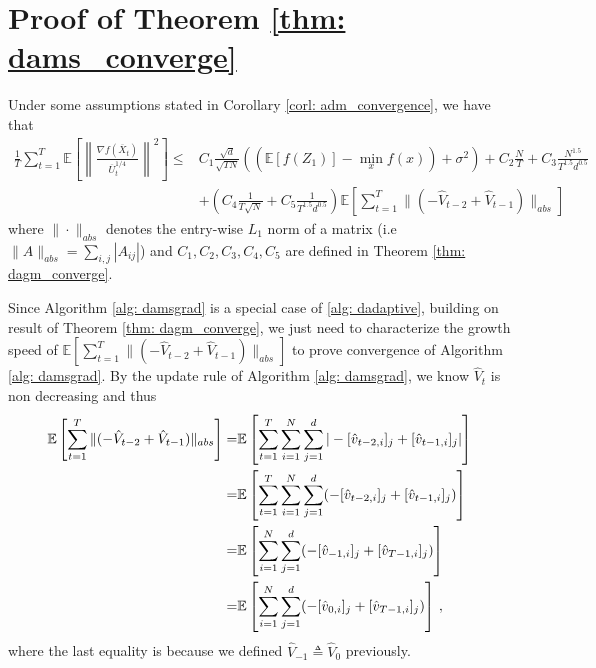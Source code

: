 \documentclass[11pt]{article}
\begin{document}
\clearpage


\section{Proof of Theorem \ref{thm: dams_converge}} \label{app: proof_ams}

Under some assumptions stated in Corollary \ref{corl: adm_convergence}, we have that
\begin{align}\label{eq: rep_thm1}
	 \frac{1}{T}\sum_{t=1}^T  \mathbb E \left [\left\|\frac{\nabla f( \overline X_{t})}{\overline U_{t}^{1/4}}\right\|^2  \right] 
	\leq  & C_1 \frac{\sqrt{d}}{\sqrt{TN}} \left(( \mathbb E  [f( Z_{1})]  -  \min_x  f(x)) +    \sigma^2 \right)  +  C_2 \frac{N}{T}  +  C_3 \frac{N^{1.5}}{T^{1.5}d^{0.5}} 
	\nonumber \\
    &+  \left(C_4 \frac{1}{T\sqrt{N}} +  C_5   \frac{1}{T^{1.5}d^{0.5}}\right)\mathbb E \left[ \sum_{t=1}^{T}   \|    (- \hat V_{t-2} + \hat V_{t-1} ) \|_{abs} \right] 
\end{align}
where $\| \cdot\|_{abs}$  denotes the entry-wise $L_1$ norm of a matrix (i.e $\| A\|_{abs} = \sum_{i,j}{|A_{ij}|}$) and $C_1, C_2 ,C_3, C_4, C_5$ are defined in Theorem \ref{thm: dagm_converge}. 

Since Algorithm \ref{alg: damsgrad} is a special case of \ref{alg: dadaptive}, building on result of Theorem \ref{thm: dagm_converge}, we just need to characterize the growth speed of $\mathbb E \left[ \sum_{t=1}^{T}   \|    (- \hat V_{t-2} + \hat V_{t-1} ) \|_{abs} \right]  $ to prove convergence of Algorithm \ref{alg: damsgrad}.  By the update rule of Algorithm \ref{alg: damsgrad}, we know $\hat V_t$ is non decreasing and thus
\begin{align}\notag
\begin{split}
\mathbb E \left[ \sum_{t=1}^{T}   \|    (- \hat V_{t-2} + \hat V_{t-1} ) \|_{abs} \right] = &\mathbb E \left[ \sum_{t=1}^{T}  \sum_{i=1}^N \sum_{j=1}^d    |- [\hat v_{t-2,i}]_j + [\hat v_{t-1,i}]_j | \right]    \\
= &\mathbb E \left[ \sum_{t=1}^{T}  \sum_{i=1}^N \sum_{j=1}^d    (- [\hat v_{t-2,i}]_j + [\hat v_{t-1,i}]_j ) \right]    \\
= &\mathbb E \left[   \sum_{i=1}^N \sum_{j=1}^d    (- [\hat v_{-1,i}]_j + [\hat v_{T-1,i}]_j ) \right]    \\
= &\mathbb E \left[   \sum_{i=1}^N \sum_{j=1}^d    (- [\hat v_{0,i}]_j + [\hat v_{T-1,i}]_j ) \right] \, ,  \\
\end{split}
\end{align}
where the last equality is because  we defined $\hat V_{-1} \triangleq \hat V_0$  previously.
\end{document}
